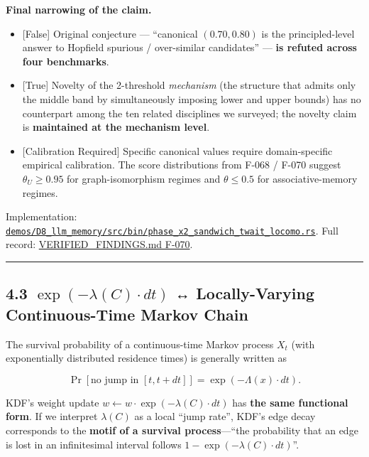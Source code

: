\textbf{Final narrowing of the claim.}

\begin{itemize}
\tightlist
\item
  {[}False{]} Original conjecture --- ``canonical \((0.70, 0.80)\) is the principled-level answer to Hopfield spurious / over-similar candidates'' --- \textbf{is refuted across four benchmarks}.
\item
  {[}True{]} Novelty of the 2-threshold \emph{mechanism} (the structure that admits only the middle band by simultaneously imposing lower and upper bounds) has no counterpart among the ten related disciplines we surveyed; the novelty claim is \textbf{maintained at the mechanism level}.
\item
  {[}Calibration Required{]} Specific canonical values require domain-specific empirical calibration. The score distributions from F-068 / F-070 suggest \(\theta_U \ge 0.95\) for graph-isomorphism regimes and \(\theta \le 0.5\) for associative-memory regimes.
\end{itemize}

Implementation: \href{../../demos/D8_llm_memory/src/bin/phase_x2_sandwich_twait_locomo.rs}{\texttt{demos/D8\_llm\_memory/src/bin/phase\_x2\_sandwich\_twait\_locomo.rs}}. Full record: \href{../VERIFIED_FINDINGS.md}{VERIFIED\_FINDINGS.md F-070}.

\begin{center}\rule{0.5\linewidth}{0.5pt}\end{center}

\subsection{\texorpdfstring{4.3 \(\exp(-\lambda(C) \cdot dt)\) ↔ Locally-Varying Continuous-Time Markov Chain}{4.3 \textbackslash exp(-\textbackslash lambda(C) \textbackslash cdot dt) ↔ Locally-Varying Continuous-Time Markov Chain}}\label{exp-lambdac-cdot-dt-locally-varying-continuous-time-markov-chain}

The survival probability of a continuous-time Markov process \(X_t\) (with exponentially distributed residence times) is generally written as

\[
\Pr[\text{no jump in } [t, t+dt]] = \exp(-\Lambda(x) \cdot dt) .
\]

KDF's weight update \(w \leftarrow w \cdot \exp(-\lambda(C) \cdot dt)\) has \textbf{the same functional form}. If we interpret \(\lambda(C)\) as a local ``jump rate'', KDF's edge decay corresponds to the \textbf{motif of a survival process}---``the probability that an edge is lost in an infinitesimal interval follows \(1 - \exp(-\lambda(C) \cdot dt)\)''.

